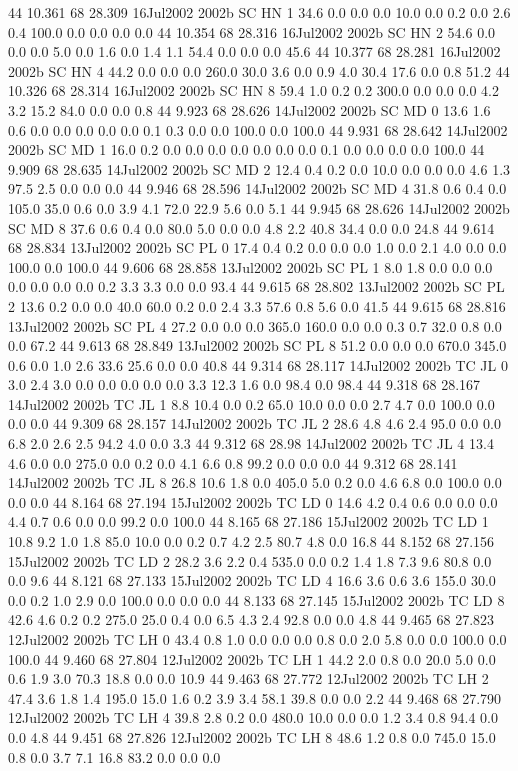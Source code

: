 44 10.361	68 28.309	16Jul2002	2002b	SC	HN	1	34.6	0.0	0.0	0.0	10.0	0.0	0.2	0.0	2.6	0.4	100.0	0.0	0.0	0.0	0.0
44 10.354	68 28.316	16Jul2002	2002b	SC	HN	2	54.6	0.0	0.0	0.0	5.0	0.0	1.6	0.0	1.4	1.1	54.4	0.0	0.0	0.0	45.6
44 10.377	68 28.281	16Jul2002	2002b	SC	HN	4	44.2	0.0	0.0	0.0	260.0	30.0	3.6	0.0	0.9	4.0	30.4	17.6	0.0	0.8	51.2
44 10.326	68 28.314	16Jul2002	2002b	SC	HN	8	59.4	1.0	0.2	0.2	300.0	0.0	0.0	0.0	4.2	3.2	15.2	84.0	0.0	0.0	0.8
44 9.923	68 28.626	14Jul2002	2002b	SC	MD	0	13.6	1.6	0.6	0.0	0.0	0.0	0.0	0.0	0.1	0.3	0.0	0.0	100.0	0.0	100.0
44 9.931	68 28.642	14Jul2002	2002b	SC	MD	1	16.0	0.2	0.0	0.0	0.0	0.0	0.0	0.0	0.0	0.1	0.0	0.0	0.0	0.0	100.0
44 9.909	68 28.635	14Jul2002	2002b	SC	MD	2	12.4	0.4	0.2	0.0	10.0	0.0	0.0	0.0	4.6	1.3	97.5	2.5	0.0	0.0	0.0
44 9.946	68 28.596	14Jul2002	2002b	SC	MD	4	31.8	0.6	0.4	0.0	105.0	35.0	0.6	0.0	3.9	4.1	72.0	22.9	5.6	0.0	5.1
44 9.945	68 28.626	14Jul2002	2002b	SC	MD	8	37.6	0.6	0.4	0.0	80.0	5.0	0.0	0.0	4.8	2.2	40.8	34.4	0.0	0.0	24.8
44 9.614	68 28.834	13Jul2002	2002b	SC	PL	0	17.4	0.4	0.2	0.0	0.0	0.0	1.0	0.0	2.1	4.0	0.0	0.0	100.0	0.0	100.0
44 9.606	68 28.858	13Jul2002	2002b	SC	PL	1	8.0	1.8	0.0	0.0	0.0	0.0	0.0	0.0	0.0	0.2	3.3	3.3	0.0	0.0	93.4
44 9.615	68 28.802	13Jul2002	2002b	SC	PL	2	13.6	0.2	0.0	0.0	40.0	60.0	0.2	0.0	2.4	3.3	57.6	0.8	5.6	0.0	41.5
44 9.615	68 28.816	13Jul2002	2002b	SC	PL	4	27.2	0.0	0.0	0.0	365.0	160.0	0.0	0.0	0.3	0.7	32.0	0.8	0.0	0.0	67.2
44 9.613	68 28.849	13Jul2002	2002b	SC	PL	8	51.2	0.0	0.0	0.0	670.0	345.0	0.6	0.0	1.0	2.6	33.6	25.6	0.0	0.0	40.8
44 9.314	68 28.117	14Jul2002	2002b	TC	JL	0	3.0	2.4	3.0	0.0	0.0	0.0	0.0	0.0	3.3	12.3	1.6	0.0	98.4	0.0	98.4
44 9.318	68 28.167	14Jul2002	2002b	TC	JL	1	8.8	10.4	0.0	0.2	65.0	10.0	0.0	0.0	2.7	4.7	0.0	100.0	0.0	0.0	0.0
44 9.309	68 28.157	14Jul2002	2002b	TC	JL	2	28.6	4.8	4.6	2.4	95.0	0.0	0.0	6.8	2.0	2.6	2.5	94.2	4.0	0.0	3.3
44 9.312	68 28.98	14Jul2002	2002b	TC	JL	4	13.4	4.6	0.0	0.0	275.0	0.0	0.2	0.0	4.1	6.6	0.8	99.2	0.0	0.0	0.0
44 9.312	68 28.141	14Jul2002	2002b	TC	JL	8	26.8	10.6	1.8	0.0	405.0	5.0	0.2	0.0	4.6	6.8	0.0	100.0	0.0	0.0	0.0
44 8.164	68 27.194	15Jul2002	2002b	TC	LD	0	14.6	4.2	0.4	0.6	0.0	0.0	0.0	4.4	0.7	0.6	0.0	0.0	99.2	0.0	100.0
44 8.165	68 27.186	15Jul2002	2002b	TC	LD	1	10.8	9.2	1.0	1.8	85.0	10.0	0.0	0.2	0.7	4.2	2.5	80.7	4.8	0.0	16.8
44 8.152	68 27.156	15Jul2002	2002b	TC	LD	2	28.2	3.6	2.2	0.4	535.0	0.0	0.2	1.4	1.8	7.3	9.6	80.8	0.0	0.0	9.6
44 8.121	68 27.133	15Jul2002	2002b	TC	LD	4	16.6	3.6	0.6	3.6	155.0	30.0	0.0	0.2	1.0	2.9	0.0	100.0	0.0	0.0	0.0
44 8.133	68 27.145	15Jul2002	2002b	TC	LD	8	42.6	4.6	0.2	0.2	275.0	25.0	0.4	0.0	6.5	4.3	2.4	92.8	0.0	0.0	4.8
44 9.465	68 27.823	12Jul2002	2002b	TC	LH	0	43.4	0.8	1.0	0.0	0.0	0.0	0.8	0.0	2.0	5.8	0.0	0.0	100.0	0.0	100.0
44 9.460	68 27.804	12Jul2002	2002b	TC	LH	1	44.2	2.0	0.8	0.0	20.0	5.0	0.0	0.6	1.9	3.0	70.3	18.8	0.0	0.0	10.9
44 9.463	68 27.772	12Jul2002	2002b	TC	LH	2	47.4	3.6	1.8	1.4	195.0	15.0	1.6	0.2	3.9	3.4	58.1	39.8	0.0	0.0	2.2
44 9.468	68 27.790	12Jul2002	2002b	TC	LH	4	39.8	2.8	0.2	0.0	480.0	10.0	0.0	0.0	1.2	3.4	0.8	94.4	0.0	0.0	4.8
44 9.451	68 27.826	12Jul2002	2002b	TC	LH	8	48.6	1.2	0.8	0.0	745.0	15.0	0.8	0.0	3.7	7.1	16.8	83.2	0.0	0.0	0.0




